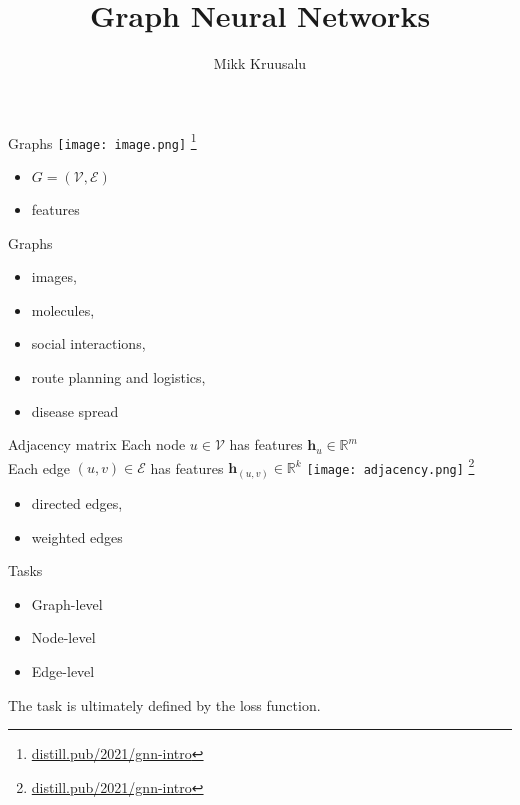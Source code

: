 \documentclass{beamer}
\title{Graph Neural Networks}
\author{Mikk Kruusalu}
\date{}
\begin{document}
\begin{frame}
    \titlepage
\end{frame}

\begin{frame}{Graphs}
    \texttt{[image: image.png]}
    \let\thefootnote\relax\footnote{\url{distill.pub/2021/gnn-intro}}

    \vspace{-0.7cm}
    \begin{itemize}
        \item $G = (\mathcal{V}, \mathcal{E})$
        \item features
    \end{itemize}

\end{frame}

\begin{frame}{Graphs}
    \begin{itemize}
        \item images,
        \item molecules,
        \item social interactions,
        \item route planning and logistics,
        \item disease spread
    \end{itemize}
\end{frame}

\begin{frame}{Adjacency matrix}
    Each node $u\in\mathcal{V}$ has features $\mathbf{h}_u\in\mathbb{R}^{m}$ \\
    Each edge $(u,v)\in\mathcal{E}$ has features $\mathbf{h}_{(u,v)}\in\mathbb{R}^{k}$
    \texttt{[image: adjacency.png]}
    \let\thefootnote\relax\footnote{\url{distill.pub/2021/gnn-intro}}

    \vspace{-0.7cm}
    \begin{itemize}
        \item directed edges,
        \item weighted edges
    \end{itemize}
\end{frame}

\begin{frame}{Tasks}
    \begin{itemize}
        \item Graph-level
        \item Node-level
        \item Edge-level
    \end{itemize}

    The task is ultimately defined by the loss function.
\end{frame}
\end{document}
